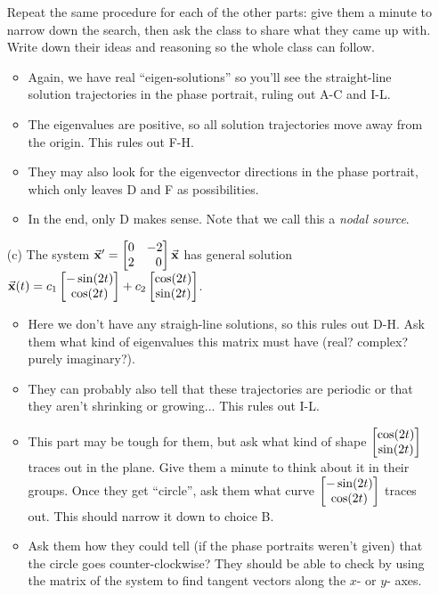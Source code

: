 \documentclass[epsf]{article}
\begin{document}
\begin{itemize}
 Repeat the same procedure for each of the other parts: give them a minute to narrow down the search, then ask the class to share what they came up with.  Write down their ideas and reasoning so the whole class can follow. 
\begin{itemize}
\item Again, we have real ``eigen-solutions'' so you'll see the straight-line solution trajectories in the phase portrait, ruling out A-C and I-L.
\item The eigenvalues are positive, so all solution trajectories move away from the origin.  This rules out F-H.
\item They may also look for the eigenvector directions in the phase portrait, which only leaves D and F as possibilities.
\item In the end, only D makes sense.  Note that we call this a \textit{nodal source}.
\end{itemize}

\item[(c)] The system $\vec{\bf x}' = \begin{bmatrix}0 & -2\cr 2 & \ \ 0 \end{bmatrix}\vec{\bf x}$ has general solution
$\vec{\bf x}(t) = c_1\begin{bmatrix}-\sin(2t) \cr \cos(2t) \end{bmatrix} + c_2\begin{bmatrix}\cos(2t)\cr \sin(2t) \end{bmatrix}$.

\begin{itemize}
\item Here we don't have any straigh-line solutions, so this rules out D-H.  Ask them what kind of eigenvalues this matrix must have (real? complex? purely imaginary?).
\item They can probably also tell that these trajectories are periodic or that they aren't shrinking or growing... This rules out I-L.
\item This part may be tough for them, but ask what kind of shape $\begin{bmatrix}\cos(2t)\cr \sin(2t) \end{bmatrix}$ traces out in the plane.  Give them a minute to think about it in their groups.  Once they get ``circle'', ask them what curve $\begin{bmatrix}-\sin(2t) \cr \cos(2t) \end{bmatrix}$ traces out.  This should narrow it down to choice B.
\item Ask them how they could tell (if the phase portraits weren't given) that the circle goes counter-clockwise?  They should be able to check by using the matrix of the system to find tangent vectors along the $x$- or $y$- axes.
\end{itemize}


\end{itemize}
\end{document}
